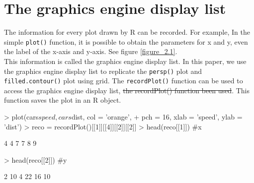 \documentclass[paper=a4, fontsize=11pt]{report}
\begin{document}
\chapter{The graphics engine display list}
The information for every plot drawn by R can be recorded. For example, In the simple \texttt{plot()} function, it is possible to obtain the parameters for x and y, even the label of the x-axis and y-axis. See figure \ref{figure_2.1}.\\

This information is called the graphics engine display list. In this paper, we use the graphics engine display list to replicate the \texttt{persp()} plot and \texttt{filled.contour()} plot using grid. The \texttt{recordPlot()} function can be used to access the graphics engine display list, \st{the recordPlot() function been used}. This function saves the plot in an R object. 

\begin{Schunk}
\begin{Sinput}
> plot(cars$speed, cars$dist, col = 'orange', 
+ pch = 16, xlab = 'speed', ylab = 'dist')
> reco = recordPlot()[[1]][[4]][[2]][[2]]
> head(reco[[1]]) #x
\end{Sinput}
\begin{Soutput}
[1] 4 4 7 7 8 9
\end{Soutput}
\begin{Sinput}
> head(reco[[2]]) #y
\end{Sinput}
\begin{Soutput}
[1]  2 10  4 22 16 10
\end{Soutput}
\end{Schunk}
\end{document}

